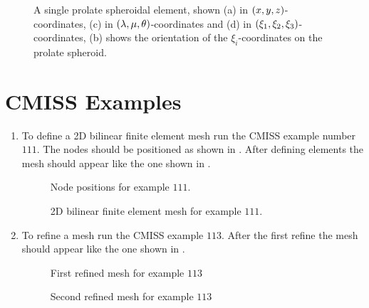 \begin{figure}[H] \centering
  
  \caption{A single prolate spheroidal element, shown (a) in 
    $\left( x,y,z \right)$-coordinates, (c) in $\left( \lambda, \mu,
      \theta \right)$-coordinates and (d) in
    $\left( \xi_{1},\xi_{2},\xi_{3} \right)$-coordinates, (b) shows the orientation
    of the $\xi_{i}$-coordinates on the prolate spheroid.}
  \label{fig:spse}
\end{figure}

\clearpage

\section{CMISS Examples}

\begin{enumerate}
\item  To define a 2D bilinear finite element mesh run the CMISS example number
  $111$.  The nodes should be positioned as shown in .
  After defining elements the mesh should appear like the one shown in
  .

  \begin{figure}[htbp] \centering
    
    \caption{Node positions for example $111$.}
    \label{fig:example111_node}
  \end{figure}

   \begin{figure}[hbtp] \centering
    
    \caption{2D bilinear finite element mesh for example $111$.}
    \label{fig:example111_elem}
  \end{figure} 
  \label{xmp:Def2D}

\item  To refine a mesh run the CMISS example $113$. After the first refine the
  mesh should appear like the one shown in .  
  \begin{figure}[htbp] \centering
    
    \caption{First refined mesh for example $113$}
    \label{fig:example113}
  \end{figure}
  \begin{figure}[htbp] \centering
    
    \caption{Second refined mesh for example $113$}
    \label{fig:example113b}
  \end{figure}
  \label{xmp:Refining}


\end{enumerate}
